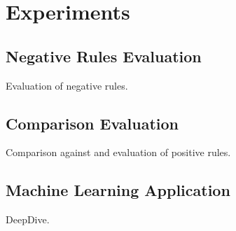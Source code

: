 \section{Experiments} \label{sec:experiment}

\subsection{Negative Rules Evaluation}
Evaluation of negative rules.

\subsection{Comparison Evaluation}
Comparison against \amie and evaluation of positive rules.

\subsection{Machine Learning Application}
DeepDive.